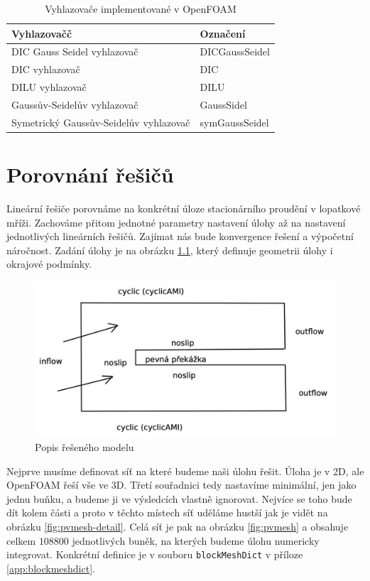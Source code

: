 \documentclass[a4paper,12pt]{report}
\theoremstyle{remark}
\begin{document}
\begin{table}[H]
	\centering
	\caption{Vyhlazovače implementované v OpenFOAM}
	\renewcommand{\arraystretch}{1.7}
	\begin{tabular}{*2l}
		\toprule
		\textbf{Vyhlazovačč} & \textbf{Označení}\\
		\midrule
		{\small DIC Gauss Seidel vyhlazovač}& DICGaussSeidel\\
		{\small DIC vyhlazovač}& DIC\\		
		{\small DILU vyhlazovač}& DILU \\		
		{\small Gaussův-Seidelův vyhlazovač}& GaussSidel  \\
		{\small Symetrický Gaussův-Seidelův vyhlazovač}& symGaussSeidel \\
		\bottomrule
	\end{tabular}
	
	\label{table:smoothers}
\end{table}

	{\let\clearpage\relax \chapter{Porovnání řešičů}}
	
	Lineární řešiče porovnáme na konkrétní úloze stacionárního proudění v lopatkové mříži. Zachováme přitom jednotné parametry nastavení úlohy až na nastavení jednotlivých lineárních řešičů. Zajímat nás bude konvergence řešení a výpočetní náročnost. Zadání úlohy je na obrázku \ref{fig:zadani}, který definuje geometrii úlohy i okrajové podmínky. 
	
	\begin{figure}[H]
		\centering
		\includegraphics[width=1\linewidth]{zadani.png}
		\caption{Popis řešeného modelu}
		\label{fig:zadani}
	\end{figure}


Nejprve musíme definovat síť na které budeme naši úlohu řešit. Úloha je v 2D, ale OpenFOAM řeší vše ve 3D. Třetí souřadnici tedy nastavíme minimální, jen jako jednu buňku, a budeme ji ve výsledcích vlastně ignorovat.  Nejvíce se toho bude dít kolem  části a proto v těchto místech síť uděláme hustší jak je vidět na obrázku \ref{fig:pvmesh-detail}. Celá síť je pak na obrázku \ref{fig:pvmesh} a obsahuje celkem $108800$ jednotlivých buněk, na kterých budeme úlohu numericky integrovat. Konkrétní definice je v souboru \texttt{blockMeshDict} v příloze \ref{app:blockmeshdict}.
\end{document}
